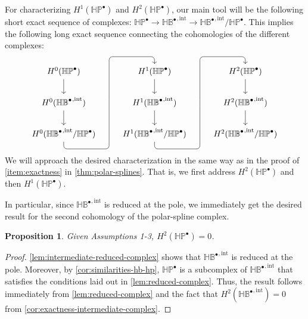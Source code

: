 \documentclass[10pt]{article}
\newcommand{\vSpace}[1]{\mathbb{#1}}
\newcommand{\complex}[1]{\mathit{\vSpace{#1}^\bullet}}
\newcommand{\bsp}{B}
\newcommand{\polar}{P}
\newcommand{\tint}{\mathrm{int}}
\newcommand{\hintComplex}{\complex{H\bsp}^{,\tint}}
\newcommand{\hpolarComplex}{\complex{H\polar}}
\theoremstyle{plain}
\newtheorem{proposition}{Proposition}[section]
\theoremstyle{definition}
\theoremstyle{remark}
\begin{document}
For characterizing $H^1(\hpolarComplex)$ and $H^2(\hpolarComplex)$, our main tool will be the following short exact sequence of complexes: $\hpolarComplex \rightarrow  \hintComplex \rightarrow \hintComplex / \hpolarComplex$.
This implies the following long exact sequence connecting the cohomologies of the different complexes:
\begin{equation}\label{eq:longExactSequence}
    \begin{tikzcd}
        H^0(\hpolarComplex) \arrow[d] & H^1(\hpolarComplex) \arrow[d] & H^2(\hpolarComplex) \arrow[d] \\
        H^0(\hintComplex) \arrow[d] \ar[draw=none]{r}[name=X, anchor=center]{}  & H^1(\hintComplex) \arrow[d] \ar[draw=none]{r}[name=Y, anchor=center]{}  & H^2(\hintComplex) \arrow[d] \\
        H^0(\hintComplex / \hpolarComplex) \ar[rounded corners,
        to path={ -- ([yshift=-2ex]\tikztostart.south)
                  -| (X.center) \tikztonodes
                  |- ([yshift=2ex]\tikztotarget.north)
                  -- (\tikztotarget)}]{ruu}[at end]{} & H^1(\hintComplex / \hpolarComplex) \ar[rounded corners,
                  to path={ -- ([yshift=-2ex]\tikztostart.south)
                            -| (Y.center) \tikztonodes
                            |- ([yshift=2ex]\tikztotarget.north)
                            -- (\tikztotarget)}]{ruu}[at end]{} & H^2(\hintComplex / \hpolarComplex)
    \end{tikzcd}
\end{equation}
We will approach the desired characterization in the same way as in the proof of \cref{item:exactness} in \cref{thm:polar-splines}.
That is, we first address $H^2(\hpolarComplex)$ and then $H^1(\hpolarComplex)$.

In particular, since $\hintComplex$ is reduced at the pole, we immediately get the desired result for the second cohomology of the polar-spline complex.
\begin{proposition}\label{prop:h2}
    Given Assumptions 1-3, $H^2(\hpolarComplex) = 0$.
\end{proposition}
\begin{proof}
    \cref{lem:intermediate-reduced-complex} shows that $\hintComplex$ is reduced at the pole.
    Moreover, by \cref{cor:similarities-hb-hp}, $\hpolarComplex$ is a subcomplex of $\hintComplex$ that satisfies the conditions laid out in \cref{lem:reduced-complex}.
    Thus, the result follows immediately from \cref{lem:reduced-complex} and the fact that $H^2(\hintComplex) = 0$ from \cref{cor:exactness-intermediate-complex}.
\end{proof}
\end{document}
